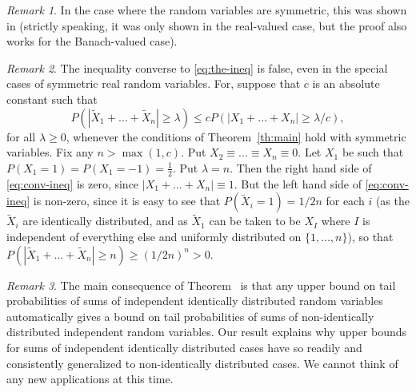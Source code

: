 \documentclass[12pt]{amsart}
\def\half{{\tfrac12}}
\def\upref#1{\upn{\ref{#1}}}
\theoremstyle{definition}
\theoremstyle{plain}
\theoremstyle{remark}
\newtheorem{rmrk}{Remark}
\begin{document}
\begin{rmrk}
        In the case where the random variables are symmetric, this was
        shown in \cite{Pruss:noniid} (strictly speaking, it was only
        shown in the real-valued case, but the proof also works for the
        Banach-valued case).
\end{rmrk}

\begin{rmrk}
        The inequality converse to \eqref{eq:the-ineq} is false, even in
        the special cases of symmetric real random variables.
        For, suppose that $c$ is an absolute constant such that
\begin{equation}\label{eq:conv-ineq}
        P(|\tilde X_1+\dots+\tilde X_n|\ge\lambda) \le cP(|X_1+\dots+
        X_n|\ge\lambda/c),
\end{equation}
        for all $\lambda\ge 0$, whenever the conditions of
        Theorem~\ref{th:main} hold with symmetric variables. Fix any
        $n>\max(1,c)$. Put
        $X_2\equiv\dots\equiv X_n\equiv 0$.  Let $X_1$ be such that
        $P(X_1=1)=P(X_1=-1)=\half$.  Put $\lambda=n$.  Then the right
        hand side of \eqref{eq:conv-ineq} is zero, since
        $|X_1+\dots+X_n|\equiv 1$.  But the left hand side of
        \eqref{eq:conv-ineq} is non-zero, since it is easy to see that
        $P(\tilde X_i=1)=1/2n$ for each $i$ (as the $\tilde X_i$ are
        identically distributed, and as $\tilde X_1$ can be taken to be
        $X_I$ where $I$ is independent of everything else and uniformly
        distributed on $\{1,\dots,n\}$), so that $P(|\tilde X_1+\dots+\tilde
        X_n|\ge n)\ge (1/2n)^n > 0$.
\end{rmrk}

\begin{rmrk}
The main consequence of Theorem~\upref{th:main} is that any upper
bound on tail probabilities of sums of independent identically
distributed random variables automatically gives a bound on tail
probabilities of sums of non-identically distributed independent
random variables.  
Our result explains why upper bounds for sums of
independent identically distributed cases have so readily and consistently
generalized to non-identically distributed cases.
We cannot think of any new 
applications at this time.
\end{rmrk}
\end{document}
